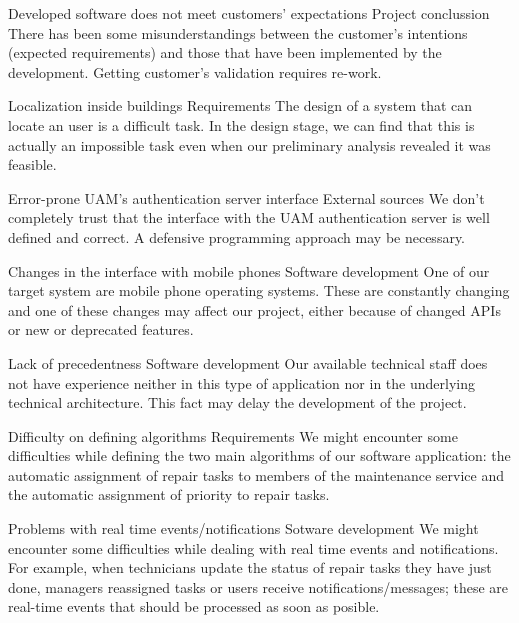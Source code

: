 \begin{risk}{Developed software does not meet customers' expectations}
\riskcat Project conclussion
\riskdesc There has been some misunderstandings between the customer's intentions (expected requirements) and those that have been implemented by the development. Getting customer's validation requires re-work.
\end{risk}

\begin{risk}{Localization inside buildings}
\riskcat Requirements
\riskdesc The design of a system that can locate an user is a difficult task. In the design stage, we can find that this is actually an impossible task even when our preliminary analysis revealed it was feasible.
\end{risk}

\begin{risk}{Error-prone UAM's authentication server interface}
\riskcat External sources
\riskdesc We don't completely trust that the interface with the UAM authentication server is well defined and correct. A defensive programming approach may be necessary.
\end{risk}

\begin{risk}{Changes in the interface with mobile phones}
\riskcat Software development
\riskdesc One of our target system are mobile phone operating systems. These are constantly changing and one of these changes may affect our project, either because of changed APIs or new or deprecated features.
\end{risk}

\begin{risk}{Lack of precedentness}
\riskcat Software development
\riskdesc Our available technical staff does not have experience neither in this type of application nor in the underlying technical architecture. This fact may delay the development of the project.
\end{risk}

\begin{risk}{Difficulty on defining algorithms}
\riskcat Requirements
\riskdesc We might encounter some difficulties while defining the two main algorithms of our software application: the automatic assignment of repair tasks to members of the maintenance service and the automatic assignment of priority to repair tasks.
\end{risk}

\begin{risk}{Problems with real time events/notifications}
\riskcat Sotware development
\riskdesc We might encounter some difficulties while dealing with real time events and notifications. For example, when technicians update the status of repair tasks they have just done, managers reassigned tasks or users receive notifications/messages; these are real-time events that should be processed as soon as posible.
\end{risk}

